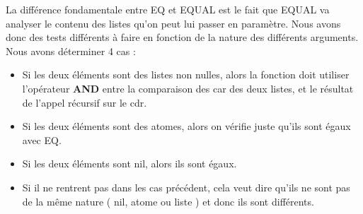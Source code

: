 \documentclass[a4paper,10pt]{report}
\begin{document}
	  La différence fondamentale entre EQ et EQUAL est le fait que EQUAL va analyser le contenu des listes qu'on peut lui passer en paramètre. Nous avons donc des tests différents
	  à faire en fonction de la nature des différents arguments. Nous avons déterminer 4 cas :
	  \begin{itemize}
	   \item Si les deux éléments sont des listes non nulles, alors la fonction doit utiliser l'opérateur \textbf{AND} entre la comparaison des car des deux listes, et le résultat de l'appel récursif sur le cdr.
	   \item Si les deux éléments sont des atomes, alors on vérifie juste qu'ils sont égaux avec EQ.
	   \item Si les deux éléments sont nil, alors ils sont égaux.
	   \item Si il ne rentrent pas dans les cas précédent, cela veut dire qu'ils ne sont pas de la même nature ( nil, atome ou liste ) et donc ils sont différents.
	  \end{itemize}

	
\end{document}
